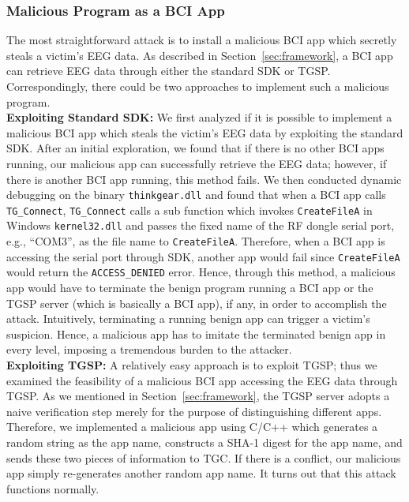 \subsubsection{Malicious Program as a BCI App}
The most straightforward attack is to install a malicious BCI app which secretly steals a victim's EEG data. As described in Section~\ref{sec:framework}, a BCI app can retrieve EEG data through either the standard SDK or TGSP. Correspondingly, there could be two approaches to implement such a malicious program. \\
\indent \textbf{Exploiting Standard SDK:} We first analyzed  if it is possible to implement a malicious BCI app which steals the victim's EEG data by exploiting the standard SDK. After an initial exploration, we found that if there is no other BCI apps running, our malicious app can successfully retrieve the EEG data; however, if there is another BCI app running, this method fails. We then  conducted dynamic debugging on the binary \texttt{thinkgear.dll} and found that when a BCI app calls \texttt{TG\_Connect}, \texttt{TG\_Connect} calls a sub function which invokes \texttt{CreateFileA} in Windows \texttt{kernel32.dll} and passes the fixed name of the RF dongle serial port, e.g., ``COM3'', as the file name to \texttt{CreateFileA}. Therefore, when a BCI app is accessing the serial port through SDK, another app would fail since \texttt{CreateFileA} would return the \texttt{ACCESS\_DENIED} error. Hence, through this method, a malicious app would have to terminate the benign program running a BCI app or the TGSP server (which is basically a BCI app), if any, in order to accomplish the attack. Intuitively, terminating a running benign app can trigger a victim's suspicion. Hence, a malicious app has to imitate the terminated benign app in every level, imposing a tremendous burden to the attacker. \\
\indent \textbf{Exploiting TGSP:} A relatively easy approach is to exploit TGSP; thus we examined the feasibility of a malicious BCI app accessing the EEG data through TGSP. As we mentioned in Section~\ref{sec:framework}, the TGSP server adopts a naive verification step merely for the purpose of distinguishing different apps. Therefore, we implemented a malicious app using C/C++ which generates a random string as the app name, constructs a SHA-1 digest for the app name, and sends these two pieces of information to TGC. If there is a conflict, our malicious app simply re-generates another random app name. It turns out that this attack functions normally.

